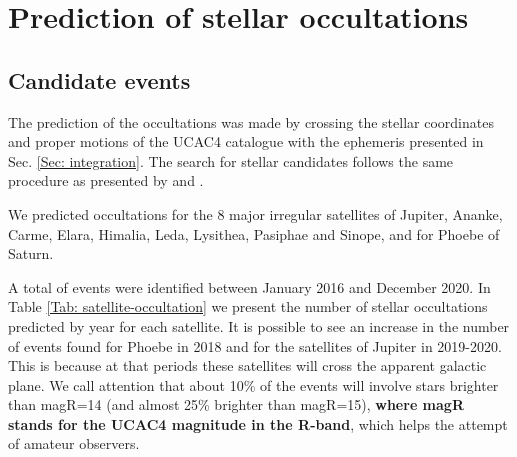 \documentclass[useAMS,usenatbib]{mn2e}
\begin{document}
%
%

\section{Prediction of stellar occultations} \label{Sec: predictions}

\subsection{Candidate events}

The prediction of the occultations was made by crossing the stellar coordinates and proper motions of the UCAC4 catalogue \citep{Zacharias2013} with the ephemeris presented in Sec. \ref{Sec: integration}. The search for stellar candidates follows the same procedure as presented by \cite{Assafin2010, Assafin2012} and \cite{Camargo2014}.

We predicted occultations for the 8 major irregular satellites of Jupiter,  Ananke, Carme, Elara, Himalia, Leda, Lysithea, Pasiphae and Sinope, and for Phoebe of Saturn.

A total of \noccs events were identified between January 2016 and December 2020. In Table \ref{Tab: satellite-occultation} we present the number of stellar occultations predicted by year for each satellite. It is possible to see an increase in the number of events found for Phoebe in 2018 and for the satellites of Jupiter in 2019-2020. This is because at that periods these satellites will cross the apparent galactic plane. We call attention that about 10\% of the events will involve stars brighter than magR=14  (and almost 25\% brighter than magR=15), \textbf{where magR stands for the UCAC4 magnitude in the R-band}, which helps the attempt of amateur observers.
\end{document}

